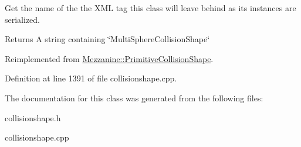 Get the name of the the XML tag this class will leave behind as its instances are serialized. 

\begin{DoxyReturn}{Returns}
A string containing \char`\"{}MultiSphereCollisionShape\char`\"{} 
\end{DoxyReturn}


Reimplemented from \hyperlink{classMezzanine_1_1PrimitiveCollisionShape_a19bb44a705ff86606834feb2783500e5}{Mezzanine::PrimitiveCollisionShape}.



Definition at line 1391 of file collisionshape.cpp.



The documentation for this class was generated from the following files:\begin{DoxyCompactItemize}
\item 
collisionshape.h\item 
collisionshape.cpp\end{DoxyCompactItemize}
